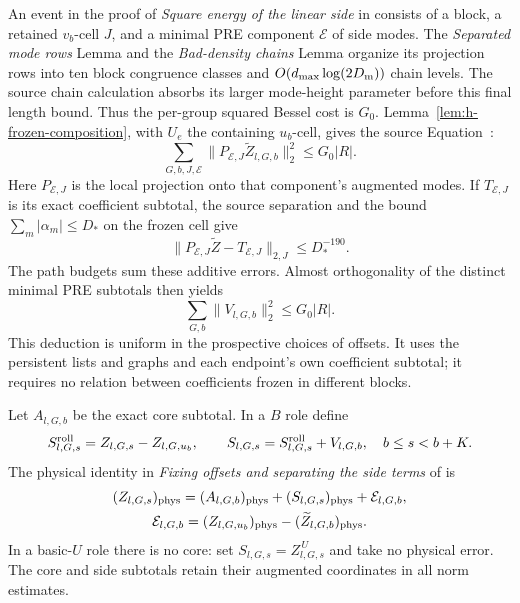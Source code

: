An event in the proof of \emph{Square energy of the linear side}
in \cite[Section~8]{H} consists of a block, a retained \(v_b\)-cell
\(J\), and a minimal PRE component \(\mathcal E\) of side modes.
The \emph{Separated mode rows} Lemma and the
\emph{Bad-density chains} Lemma organize its projection rows into
ten block congruence classes and
\(O(d_{\max}\log(2D_{\rm m}))\) chain levels.  The source chain
calculation absorbs its larger mode-height parameter before this
final length bound.  Thus the per-group squared Bessel cost is
\(G_0\).  Lemma~\ref{lem:h-frozen-composition}, with \(U_e\) the
containing \(u_b\)-cell, gives the source Equation~:
\[
 \sum_{G,b,J,\mathcal E}
       \|P_{\mathcal E,J}\widetilde Z_{l,G,b}\|_2^2
       \le G_0|R|.
\]
Here \(P_{\mathcal E,J}\) is the local projection onto that
component's augmented modes.  If \(T_{\mathcal E,J}\) is its
exact coefficient subtotal, the source separation and the bound
\(\sum_m|\alpha_m|\le D_*\) on the frozen cell give
\[
 \|P_{\mathcal E,J}\widetilde Z-T_{\mathcal E,J}\|_{2,J}
       \le D_*^{-190}.
\]
The path budgets sum these additive errors.  Almost orthogonality
of the distinct minimal PRE subtotals then yields
\begin{equation}
 \sum_{G,b}\|V_{l,G,b}\|_2^2\le G_0|R|.
 \label{eq:h-linear-energy}
\end{equation}
This deduction is uniform in the prospective choices of offsets.  It uses the
persistent lists and graphs and each endpoint's own coefficient
subtotal; it requires no relation between coefficients frozen in
different blocks.

Let \(A_{l,G,b}\) be the exact core subtotal.  In a \(B\) role
define
\[
 S^{\rm roll}_{l,G,s}=Z_{l,G,s}-Z_{l,G,u_b},\qquad
 S_{l,G,s}=S^{\rm roll}_{l,G,s}+V_{l,G,b},
 \quad b\le s<b+K.
\]
The physical identity in
\emph{Fixing offsets and separating the side terms} of
\cite[Section~8]{H} is
\begin{equation}
 \begin{gathered}
 (Z_{l,G,s})_{\rm phys}
   =(A_{l,G,b})_{\rm phys}+(S_{l,G,s})_{\rm phys}
          +\mathcal E_{l,G,b},\\
 \mathcal E_{l,G,b}
   =(Z_{l,G,u_b})_{\rm phys}
          -(\widetilde Z_{l,G,b})_{\rm phys}.
 \end{gathered}
 \label{eq:h-core-side}
\end{equation}
In a basic-\(U\) role there is no core: set
\(S_{l,G,s}=Z_{l,G,s}^{\,U}\) and take no physical error.
The core and side subtotals retain their augmented coordinates
in all norm estimates.

